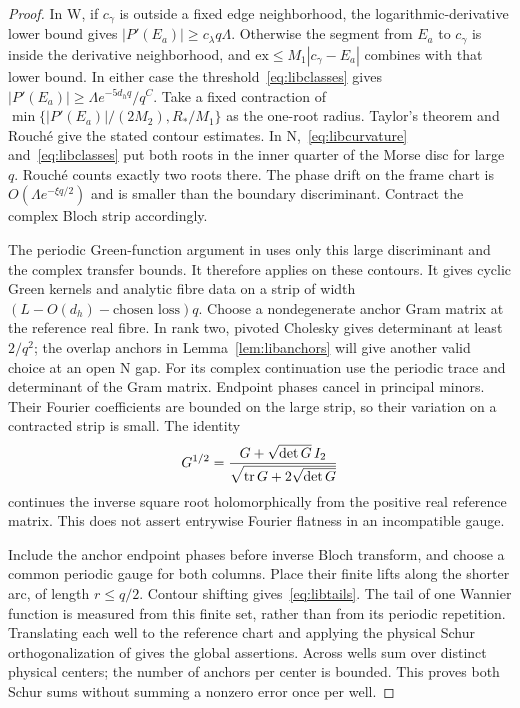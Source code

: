 \begin{proof}
In W, if $c_\gamma$ is outside a fixed edge neighborhood, the logarithmic-derivative lower bound gives $|P'(E_a)|\ge c_\lambda q\Lambda$. Otherwise the segment from $E_a$ to $c_\gamma$ is inside the derivative neighborhood, and $\mathrm{ex}\le M_1|c_\gamma-E_a|$ combines with that lower bound. In either case the threshold~\eqref{eq:libclasses} gives
$|P'(E_a)|\ge\Lambda e^{-5d_hq}/q^C$.
Take a fixed contraction of
$\min\{|P'(E_a)|/(2M_2),R_*/M_1\}$ as the one-root radius.
Taylor's theorem and Rouch\'e give the stated contour estimates.
In N,~\eqref{eq:libcurvature} and~\eqref{eq:libclasses} put both roots
in the inner quarter of the Morse disc for large $q$.
Rouch\'e counts exactly two roots there. The phase drift on the
frame chart is $O(\Lambda e^{-\xi q/2})$ and is smaller than the
boundary discriminant. Contract the complex Bloch strip accordingly.

The periodic Green-function argument in
\cite[Appendix B, Periodic Green function and Analytic fibre data]{DMband}
uses only this large discriminant and the complex transfer bounds.
It therefore applies on these contours. It gives cyclic Green
kernels and analytic fibre data on a strip of width
$(L-O(d_h)-\text{chosen loss})q$.
Choose a nondegenerate anchor Gram matrix at the reference real
fibre. In rank two, pivoted Cholesky gives determinant at least
$2/q^2$; the overlap anchors in Lemma~\ref{lem:libanchors} will give
another valid choice at an open N gap.
For its complex continuation use the periodic trace and determinant
of the Gram matrix. Endpoint phases cancel in principal minors.
Their Fourier coefficients are bounded on the large strip, so their
variation on a contracted strip is small. The identity
\[
 G^{1/2}=\frac{G+\sqrt{\det G}\,I_2}
                 {\sqrt{\operatorname{tr} G+2\sqrt{\det G}}}
\]
continues the inverse square root holomorphically from the positive
real reference matrix. This does not assert entrywise Fourier
flatness in an incompatible gauge.

Include the anchor endpoint phases before inverse Bloch transform,
and choose a common periodic gauge for both columns. Place their
finite lifts along the shorter arc, of length $r\le q/2$.
Contour shifting gives~\eqref{eq:libtails}. The tail of one Wannier
function is measured from this finite set, rather than from its
periodic repetition. Translating each well to the reference chart
and applying the physical Schur orthogonalization of
\cite[Appendix C, Overlap cancellation and global orthogonalization]{DMband}
gives the global assertions. Across wells sum over distinct physical
centers; the number of anchors per center is bounded. This proves
both Schur sums without summing a nonzero error once per well.
\end{proof}

